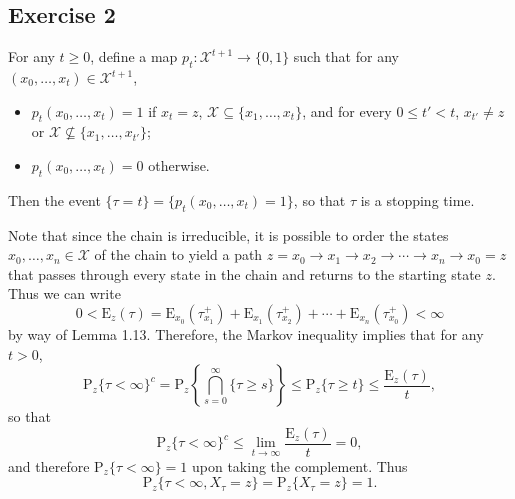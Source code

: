 \documentclass[12pt]{article}
\newcommand{\E}{\mathrm{E}}
\newcommand{\Prob}{\mathrm{P}}
\begin{document}
\subsection*{Exercise 2}

For any $t \geq 0$, define a map $p_t : \mathcal{X}^{t+1} \to \{0, 1\}$ such that for any $(x_0, \ldots, x_t) \in \mathcal{X}^{t+1}$,
\begin{itemize}
\item
$p_t(x_0, \ldots, x_t) = 1$ if $x_t = z$, $\mathcal{X} \subseteq \{x_1, \ldots, x_t\}$, and for every $0 \leq t' < t$, $x_{t'} \neq z$ or $\mathcal{X} \not \subseteq \{x_1, \ldots, x_{t'}\}$;

\item
$p_t(x_0, \ldots, x_t) = 0$ otherwise.

\end{itemize}
Then the event $\{\tau = t\} = \{p_t(x_0, \ldots, x_t) = 1\}$, so that $\tau$ is a stopping time.

Note that since the chain is irreducible, it is possible to order the states $x_0, \ldots, x_n \in \mathcal{X}$ of the chain to yield a path $z = x_0 \rightarrow x_1 \rightarrow x_2 \rightarrow \cdots \rightarrow x_n \rightarrow x_0 = z$ that passes through every state in the chain and returns to the starting state $z$. Thus we can write
\begin{equation*}
0 < \E_z(\tau) = \E_{x_0}(\tau_{x_1}^+) + \E_{x_1}(\tau_{x_2}^+) + \cdots + \E_{x_n}(\tau_{x_0}^+) < \infty
\end{equation*}
by way of Lemma 1.13. Therefore, the Markov inequality implies that for any $t > 0$,
\begin{equation*}
\Prob_z\{\tau < \infty\}^c = \Prob_z\left\{\bigcap_{s=0}^\infty \{\tau \geq s\} \right\} \leq \Prob_z\{\tau \geq t\} \leq \frac{\E_z(\tau)}{t},
\end{equation*}
so that
\begin{equation*}
\Prob_z\{\tau < \infty\}^c \leq \lim_{t \to \infty} \frac{\E_z(\tau)}{t} = 0,
\end{equation*}
and therefore $\Prob_z\{\tau < \infty\} = 1$ upon taking the complement. Thus
\begin{equation*}
\Prob_z\{\tau < \infty, X_\tau = z\} = \Prob_z\{X_\tau = z\} = 1.
\end{equation*}
\end{document}
